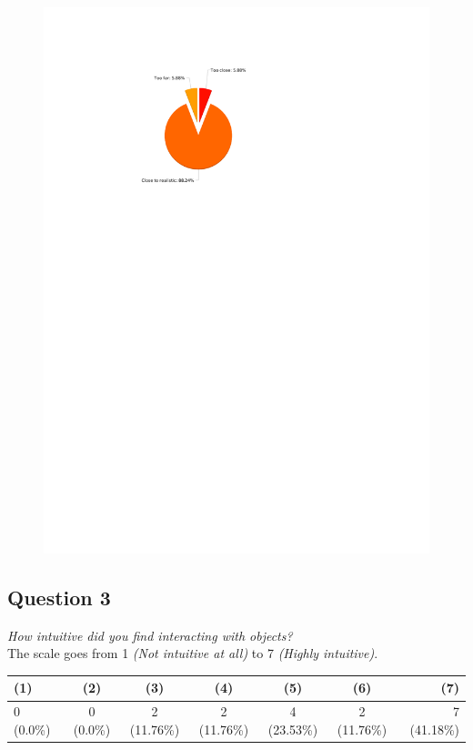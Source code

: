 \begin{figure}[H]
	\centering
	\includegraphics[width=0.6\linewidth]{gfx/Chapter_EvaluationResults/ALFTask/question2}
\end{figure}

\subsection{Question 3}\label{question1:3}
\emph{How intuitive did you find interacting with objects?}\\

The scale goes from 1 \emph{(Not intuitive at all)} to 7 \emph{(Highly intuitive)}.
\begin{table}[H]
	\begin{center}
		\small \begin{tabular*}{1.15\columnwidth}{lcccccr}
			\\ \hline \hline
			(1) & (2) & (3) & (4) & (5) & (6) & (7) \\ \hline \hline

		 	0 (0.0\%) & 0 (0.0\%) & 2 (11.76\%) & 2 (11.76\%) &	4 (23.53\%) & 2 (11.76\%) & 7 (41.18\%)\\ \hline
		\end{tabular*}
	\end{center}
\end{table}

